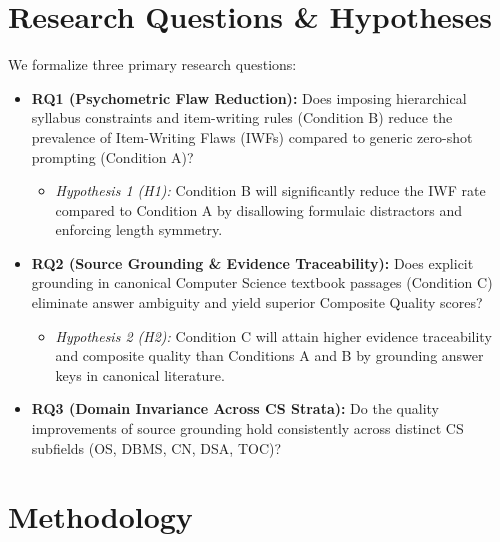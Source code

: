 \documentclass[10pt,twocolumn,letterpaper]{article}
\begin{document}
\section{Research Questions \& Hypotheses}
We formalize three primary research questions:
\begin{itemize}
    \item \textbf{RQ1 (Psychometric Flaw Reduction):} Does imposing hierarchical syllabus constraints and item-writing rules (Condition B) reduce the prevalence of Item-Writing Flaws (IWFs) compared to generic zero-shot prompting (Condition A)?
    \begin{itemize}
        \item \textit{Hypothesis 1 (H1):} Condition B will significantly reduce the IWF rate compared to Condition A by disallowing formulaic distractors and enforcing length symmetry.
    \end{itemize}
    \item \textbf{RQ2 (Source Grounding \& Evidence Traceability):} Does explicit grounding in canonical Computer Science textbook passages (Condition C) eliminate answer ambiguity and yield superior Composite Quality scores?
    \begin{itemize}
        \item \textit{Hypothesis 2 (H2):} Condition C will attain higher evidence traceability and composite quality than Conditions A and B by grounding answer keys in canonical literature.
    \end{itemize}
    \item \textbf{RQ3 (Domain Invariance Across CS Strata):} Do the quality improvements of source grounding hold consistently across distinct CS subfields (OS, DBMS, CN, DSA, TOC)?
\end{itemize}

\section{Methodology}
\end{document}
